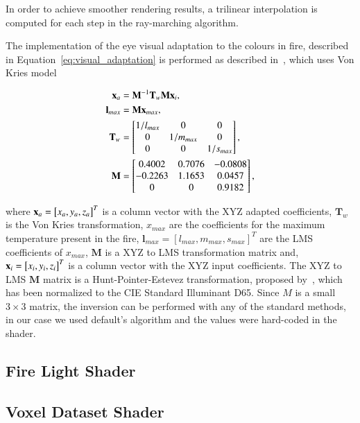 In order to achieve smoother rendering results, a trilinear interpolation is computed for each step in the ray-marching algorithm. 

The implementation of the eye visual adaptation to the colours in fire, described in Equation~\ref{eq:visual_adaptation} is performed as described in~\cite{Nguyen:2002}, which uses Von Kries model~\cite{Fairchild:2005} 

\begin{equation}
\begin{split}
\mathbf{x}_a &= \mathbf{M}^{-1} \mathbf{T}_w \mathbf{M} \mathbf{x}_i, \\
\mathbf{l}_{max} &= \mathbf{M} \mathbf{x}_{max}, \\
\mathbf{T}_w &= 
\begin{bmatrix}
1 / l_{max} & 0 & 0\\
0 & 1 / m_{max} & 0\\
0 & 0 & 1 / s_{max}\\
\end{bmatrix}, \\
\mathbf{M} &= 
\begin{bmatrix}
0.4002 & 0.7076 & -0.0808\\
-0.2263 & 1.1653 & 0.0457\\
0 & 0 & 0.9182\\
\end{bmatrix},
\end{split}
\end{equation}

where $\mathbf{x}_a = \left[ x_a, y_a, z_a \right]^{T}$ is a column vector with the XYZ adapted coefficients, $\mathbf{T}_w$ is the Von Kries transformation, $x_{max}$ are the coefficients for the maximum temperature present in the fire,  $\mathbf{l}_{max} = \left[ l_{max}, m_{max}, s_{max} \right]^{T}$ are the LMS coefficients of $x_{max}$, $\mathbf{M}$ is a XYZ to LMS transformation matrix and, $\mathbf{x}_i = \left[ x_i, y_i, z_i \right]^{T}$ is a column vector with the XYZ input coefficients.
The XYZ to LMS $\mathbf{M}$ matrix is a Hunt-Pointer-Estevez transformation, proposed by~\cite{Hunt:1985}, which has been normalized to the CIE Standard Illuminant D65.
Since $M$ is a small $3 \times 3$ matrix, the inversion can be performed with any of the standard methods, in our case we used \Matlab default's algorithm and the values were hard-coded in the shader.

\subsection{Fire Light Shader}
\label{sec:fire_light_shader}


\subsection{Voxel Dataset Shader}
\label{sec:voxel_dataset_shader}